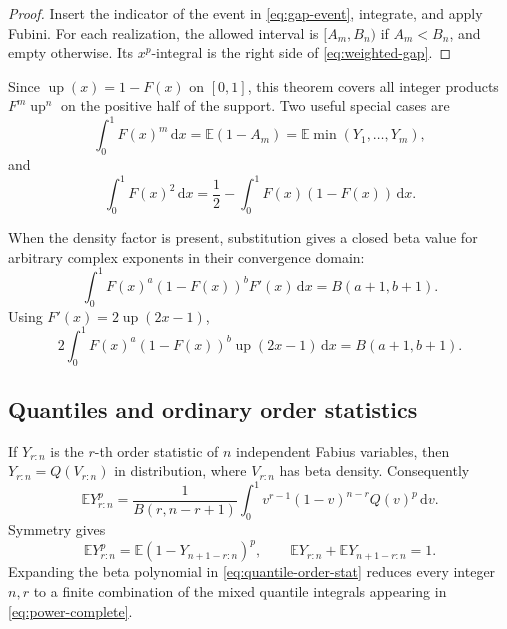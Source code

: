 \documentclass[11pt,oneside]{article}
\theoremstyle{definition}
\newcommand{\F}{F}
\newcommand{\Q}{Q}
\newcommand{\upf}{\operatorname{up}}
\newcommand{\E}{\mathbb E}
\newcommand{\dd}{\,\mathrm d}
\begin{document}
\begin{proof}
Insert the indicator of the event in \cref{eq:gap-event}, integrate, and apply Fubini.
For each realization, the allowed interval is \([A_m,B_n)\) if \(A_m<B_n\), and empty
otherwise.  Its \(x^p\)-integral is the right side of \cref{eq:weighted-gap}.
\end{proof}

Since \(\upf(x)=1-\F(x)\) on \([0,1]\), this theorem covers all integer products
\(\F^m\upf^n\) on the positive half of the support.  Two useful special cases are
\begin{equation}\label{eq:Fm-order}
 \int_0^1\F(x)^m\dd x=\E(1-A_m)=\E\min(Y_1,\ldots,Y_m),
\end{equation}
and
\begin{equation}\label{eq:F2-gini-relation}
 \int_0^1\F(x)^2\dd x
 =\frac12-\int_0^1\F(x)(1-\F(x))\dd x.
\end{equation}

When the density factor is present, substitution gives a closed beta value for arbitrary
complex exponents in their convergence domain:
\begin{equation}\label{eq:density-beta}
 \int_0^1\F(x)^a(1-\F(x))^b\F'(x)\dd x
 =B(a+1,b+1).
\end{equation}
Using \(\F'(x)=2\upf(2x-1)\),
\begin{equation}\label{eq:up-density-beta}
 2\int_0^1\F(x)^a(1-\F(x))^b\upf(2x-1)\dd x
 =B(a+1,b+1).
\end{equation}

\subsection{Quantiles and ordinary order statistics}

If \(Y_{r:n}\) is the \(r\)-th order statistic of \(n\) independent Fabius variables,
then \(Y_{r:n}=\Q(V_{r:n})\) in distribution, where \(V_{r:n}\) has beta density.
Consequently
\begin{equation}\label{eq:quantile-order-stat}
 \E Y_{r:n}^p
 =\frac1{B(r,n-r+1)}
 \int_0^1v^{r-1}(1-v)^{n-r}\Q(v)^p\dd v.
\end{equation}
Symmetry gives
\begin{equation}\label{eq:order-stat-symmetry}
 \E Y_{r:n}^p
 =\E(1-Y_{n+1-r:n})^p,
 \qquad
 \E Y_{r:n}+\E Y_{n+1-r:n}=1.
\end{equation}
Expanding the beta polynomial in \cref{eq:quantile-order-stat} reduces every integer
\(n,r\) to a finite combination of the mixed quantile integrals appearing in
\cref{eq:power-complete}.
\end{document}
